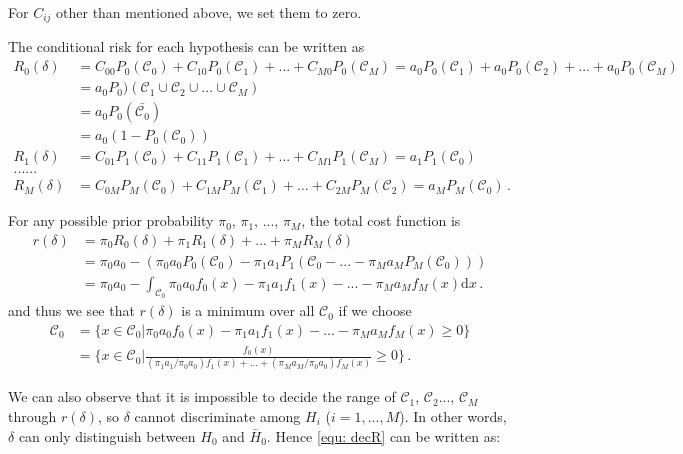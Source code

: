 \documentclass[12pt,journal,a4paper,twoside,onecolumn]{IEEEtran}
\begin{document}
\begin{spacing}{2.5}
For $C_{ij}$ other than mentioned above, we set them to zero. 

The conditional risk for each hypothesis can be written as
\begin{equation}
\begin{split}
R_0(\delta) &= C_{00}P_0(\mathcal{C}_0) + C_{10}P_0(\mathcal{C}_1) + ... +  C_{M0}P_0(\mathcal{C}_M) = a_0P_0(\mathcal{C}_1) + a_0P_0(\mathcal{C}_2) + ... + a_0P_0(\mathcal{C}_M)\\
&= a_0P_0)(\mathcal{C}_1\cup \mathcal{C}_2 \cup ... \cup \mathcal{C}_M)\\
&= a_0P_0(\bar{\mathcal{C}_0})\\
&= a_0(1 - P_0(\mathcal{C}_0))\\
R_1(\delta) &= C_{01}P_1(\mathcal{C}_0) + C_{11}P_1(\mathcal{C}_1) + ... +  C_{M1}P_1(\mathcal{C}_M)  = a_1P_1(\mathcal{C}_0)\\
......\\
R_M(\delta) &= C_{0M}P_M(\mathcal{C}_0) + C_{1M}P_M(\mathcal{C}_1) + ... +  C_{2M}P_M(\mathcal{C}_2) = a_MP_M(\mathcal{C}_0)\,.
\end{split}
\end{equation}

For any possible prior probability $\pi_0$, $\pi_1$, ..., $\pi_M$, the total cost function is 
\begin{equation}
\begin{split}
r(\delta) &= \pi_0 R_0(\delta) + \pi_1R_1(\delta) + ... +  \pi_MR_M(\delta)\\
&= \pi_0a_0 - (\pi_0a_0P_0(\mathcal{C}_0) - \pi_1a_1P_1(\mathcal{C}_0 - ... - \pi_Ma_MP_M(\mathcal{C}_0)))\\
&= \pi_0a_0 - \int_{\mathcal{C}_0}\pi_0a_0f_0(x) - \pi_1a_1f_1(x) - ... - \pi_Ma_Mf_M(x) \mathrm{d}x\,. 
\end{split}
\end{equation}
and thus we see that $r(\delta)$ is a minimum over all $\mathcal{C}_0$ if we choose
\begin{equation}
\begin{split}
\label{equ: C}
\mathcal{C}_0 &= \{ x\in \mathcal{C}_0 | \pi_0a_0f_0(x) - \pi_1a_1f_1(x) - ... - \pi_Ma_Mf_M(x) \geq 0\}\\
&= \{ x\in \mathcal{C}_0 | \frac{f_0(x)}{(\pi_1a_1/\pi_0a_0)f_1(x) + ... +  (\pi_Ma_M/\pi_0a_0)f_M(x)} \geq 0 \}\,.
\end{split}
\end{equation}

We can also observe that it is impossible to decide the range of $\mathcal{C}_1$, $\mathcal{C}_2$..., $\mathcal{C}_M$ through $r(\delta)$,  so $\delta$ cannot discriminate among $H_i$ ($ i = 1, ..., M$). In other words, $\delta$ can only distinguish between $H_0$ and $\bar{H}_0$.  Hence \eqref{equ: decR} can be written as: 


\end{spacing}
\end{document}
